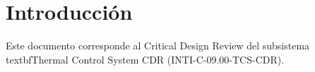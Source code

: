 \section{Introducción}
Este documento corresponde al Critical Design Review del subsistema \\textbf{Thermal Control System CDR} (INTI-C-09.00-TCS-CDR).
